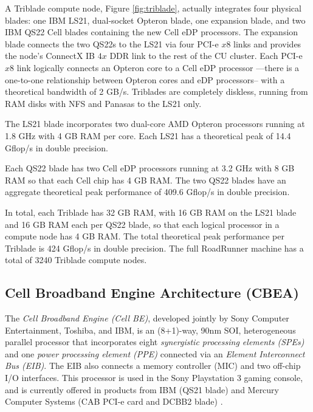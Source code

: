 \documentclass[letter,10pt]{article}
\begin{document}
A Triblade compute node, Figure \ref{fig:triblade}, actually integrates
four physical blades: one IBM LS21, dual-socket Opteron blade, one
expansion blade, and two IBM QS22 Cell blades containing the new
Cell eDP processors.  The expansion blade connects the two QS22s to
the LS21 via four PCI-e $x8$ links and provides the node's
ConnectX IB $4x$ DDR link to the rest of the CU cluster.
Each PCI-e $x8$ link logically connects an Opteron core to a
Cell eDP processor ---there is a one-to-one relationship between
Opteron cores and eDP processors-- with a theoretical bandwidth
of 2 GB/s.  Triblades are completely diskless, running from RAM disks
with NFS and Panasas \cite{panasas} to the LS21 only.

The LS21 blade incorporates two dual-core AMD Opteron processors
running at 1.8 GHz with 4 GB RAM per core.  Each LS21 has a
theoretical peak of 14.4 Gflop/s in double precision.

Each QS22 blade has two Cell eDP processors running at 3.2 GHz
with 8 GB RAM so that each Cell chip has 4 GB RAM.  The two QS22
blades have an aggregate theoretical peak performance of
409.6 Gflop/s in double precision.

In total, each Triblade has 32 GB RAM, with 16 GB RAM on the
LS21 blade and 16 GB RAM each per QS22 blade, so that each
logical processor in a compute node has 4 GB RAM.  The total
theoretical peak performance per Triblade is 424 Gflop/s in
double precision.  The full RoadRunner machine has a total of
3240 Triblade compute nodes.

\subsection*{Cell Broadband Engine Architecture (CBEA)}


The \emph{Cell Broadband Engine (Cell BE)}, developed jointly by Sony
Computer Entertainment, Toshiba, and IBM, is an (8+1)-way, 90nm SOI,
heterogeneous parallel processor that incorporates eight
\emph{synergistic processing elements (SPEs)} and one
\emph{power processing element (PPE)} connected via an
\emph{Element Interconnect Bus (EIB)}.  The EIB also connects
a memory controller (MIC) and two off-chip I/O interfaces.
This processor is used in the Sony Playstation 3 gaming console,
and is currently offered in products from IBM (QS21 blade)
and Mercury Computer Systems
(CAB PCI-e card and DCBB2 blade) \cite{mercury}.
\end{document}
